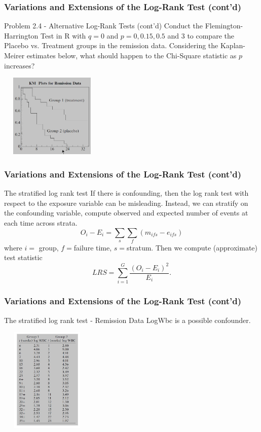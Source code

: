 \documentclass{beamer}
\theoremstyle{definition}
\begin{document}
\begin{frame}
\frametitle{Variations and Extensions of the Log-Rank Test (cont'd)}
\begin{block}{Problem 2.4 - Alternative Log-Rank Tests (cont'd)}
Conduct the Flemington-Harrington Test in R with $q=0$ and $p=0, 0.15, 0.5$ and 3 to compare the Placebo vs. Treatment groups in the remission data. Considering the Kaplan-Meirer estimates below, what should happen to the Chi-Square statistic as $p$ increases?
\end{block}
\begin{center}
         \includegraphics[width =5.0cm, height=4.0cm]{Ch2_KM_GR12.JPG}
\end{center}
\end{frame}

\begin{frame}
\frametitle{Variations and Extensions of the Log-Rank Test (cont'd)}
\begin{block}{The stratified log rank test}
If there is confounding, then the log rank test with respect to the exposure variable can be misleading. Instead, we can stratify on the confounding variable, compute observed and expected number of events at each time across strata.
\[
O_i-E_i = \sum_s \sum_f (m_{ifs} - e_{ifs})
\]
where $i=$ group, $f=$failure time, $s=$stratum.
Then we compute (approximate) test statistic
\[ LRS = \sum_{i=1}^{G} \frac{(O_i-E_i)^2}{E_i}.
\]
\end{block}
\end{frame}

\begin{frame}
\frametitle{Variations and Extensions of the Log-Rank Test (cont'd)}
\begin{block}{The stratified log rank test - Remission Data}
LogWbc is a possible confounder.
\begin{center}
\includegraphics[width =4.5cm, height=5cm]{Ch1-RemissionwLogwbc.JPG}
\end{center}
\end{block}
\end{frame}
\end{document}
